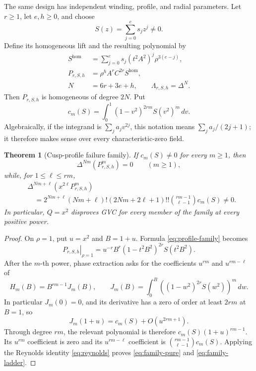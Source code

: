 \documentclass[11pt]{article}
\newtheorem{theorem}{Theorem}[section]
\begin{document}
The same design has independent winding, profile, and radial parameters.
Let $r\geq1$, let $e,h\geq0$, and choose
\[
 S(z)=\sum_{j=0}^e s_jz^j\ne0.
\]
Define its homogeneous lift and the resulting polynomial by
\begin{equation}\label{eq:profile-family}
 \begin{aligned}
 S^{\mathrm{hom}}
   &=\sum_{j=0}^e
      s_j(t^2A^2)^j\rho^{3(e-j)},\\
 P_{r,S,h}
   &=\rho^hA^rC^{2r}S^{\mathrm{hom}},\\
 N&=6r+3e+h,
 \qquad \Lambda_{r,S,h}=\Delta^N.
 \end{aligned}
\end{equation}
Then $P_{r,S,h}$ is homogeneous of degree $2N$.  Put
\begin{equation}\label{eq:profile-moment}
 c_m(S)=\int_0^1
   (1-v^2)^{2rm}S(v^2)^m\,dv.
\end{equation}
Algebraically, if the integrand is $\sum_j a_jv^{2j}$, this notation means
$\sum_j a_j/(2j+1)$; it therefore makes sense over every
characteristic-zero field.

\begin{theorem}[Cusp-profile failure family]\label{thm:family}
If $c_m(S)\ne0$ for every $m\geq1$, then
\begin{equation}\label{eq:family-pure}
 \Delta^{Nm}(P_{r,S,h}^m)=0
 \qquad(m\geq1),
\end{equation}
while, for $1\leq\ell\leq rm$,
\begin{equation}\label{eq:family-ladder}
 \begin{aligned}
 &\Delta^{Nm+\ell}
   \left(x^{2\ell}P_{r,S,h}^m\right)\\
 &\quad={}
 2^{Nm+\ell}(Nm+\ell)!(2Nm+2\ell+1)!!
 \binom{rm-1}{\ell-1}c_m(S)\ne0.
 \end{aligned}
\end{equation}
In particular, $Q=x^2$ disproves GVC for every member of the family at
every positive power.
\end{theorem}

\begin{proof}
On $\rho=1$, put $u=x^2$ and $B=1+u$.  Formula
\eqref{eq:profile-family} becomes
\[
 \left.P_{r,S,h}\right|_{\rho=1}
 =u^{-r}B^r(1-t^2B^2)^{2r}S(t^2B^2).
\]
After the $m$-th power, phase extraction asks for the coefficients
$u^{rm}$ and $u^{rm-\ell}$ of
\[
 H_m(B)=B^{rm-1}J_m(B),
 \qquad
 J_m(B)=\int_0^B\left((1-w^2)^{2r}S(w^2)\right)^m\,dw.
\]
In particular $J_m(0)=0$, and its derivative has a zero of order at
least $2rm$ at $B=1$, so
\[
 J_m(1+u)=c_m(S)+O(u^{2rm+1}).
\]
Through degree $rm$, the relevant polynomial is therefore
$c_m(S)(1+u)^{rm-1}$.  Its $u^{rm}$ coefficient is zero and its
$u^{rm-\ell}$ coefficient is
$\binom{rm-1}{\ell-1}c_m(S)$.  Applying the Reynolds identity
\eqref{eq:reynolds} proves \eqref{eq:family-pure} and
\eqref{eq:family-ladder}.
\end{proof}
\end{document}
